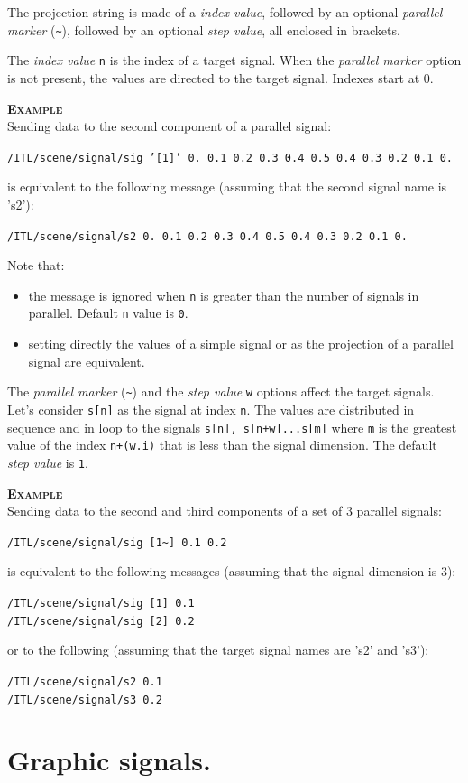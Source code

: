 \documentclass[a4paper,twoside]{report}
\newcommand{\sublevel}[1]	{\section{#1}}
\newcommand{\OSC}[1]		{\texttt{#1}}
\newcommand{\values}[1]	{\texttt{#1}}
\newcommand{\example}		{\textbf{\hspace{-1.5cm}\textbf{\textsc{Example }}}}
\newcommand{\sample}	[1]			{\vspace{-2mm}\begin{center}\colorbox{mygrey}{
								\begin{minipage}[t]{0.9\columnwidth} 
								{\small \texttt{#1}}
								\end{minipage}}\end{center}}
\newcommand{\sampleindent}	{ \hspace{0.5cm} }
\begin{document}
The projection string is made of a \emph{index value}, followed by an optional \emph{parallel marker} (\OSC{\~{}}), followed by an optional \emph{step value}, all enclosed in brackets.

The \emph{index value} \values{n} is the index of a target signal. When the \emph{parallel marker} option is not present, the values are directed to the target signal. Indexes start at 0.

\example \\
Sending data to the second component of a parallel signal:
\sample{/ITL/scene/signal/sig '[1]' 0.\ 0.1\ 0.2\ 0.3\ 0.4\ 0.5\ 0.4\ 0.3\ 0.2\ 0.1\ 0.}
\sampleindent is equivalent to the following message (assuming that the second signal name is 's2'):
\sample{/ITL/scene/signal/s2 0.\ 0.1\ 0.2\ 0.3\ 0.4\ 0.5\ 0.4\ 0.3\ 0.2\ 0.1\ 0.}

Note that:
\begin{itemize}
\item the message is ignored when \values{n} is greater than the number of signals in parallel. Default \values{n} value is \values{0}. 
\item setting directly the values of a simple signal or as the projection of a parallel signal are equivalent.
\end{itemize}

The \emph{parallel marker} (\OSC{\~{}}) and the \emph{step value} \values{w} options affect the target signals. Let's consider \values{s[n]} as the signal at index \values{n}. The values are distributed in sequence and in loop to the signals \values{s[n], s[n+w]...s[m]} where \values{m} is the greatest value of the index \values{n+(w.i)} that is less than the signal dimension. The default  \emph{step value} is \values{1}.

\example \\
Sending data to the second and third components of a set of 3 parallel signals:
\sample{/ITL/scene/signal/sig [1\~{}] 0.1 0.2}
\sampleindent is equivalent to the following messages (assuming that the signal dimension is 3):
\sample{/ITL/scene/signal/sig [1] 0.1\\
/ITL/scene/signal/sig [2] 0.2
}
\sampleindent or to the following (assuming that the target signal names are 's2' and 's3'):
\sample{/ITL/scene/signal/s2 0.1\\
/ITL/scene/signal/s3 0.2
}


\sublevel{Graphic signals.}
\label{gsignal}
\end{document}
